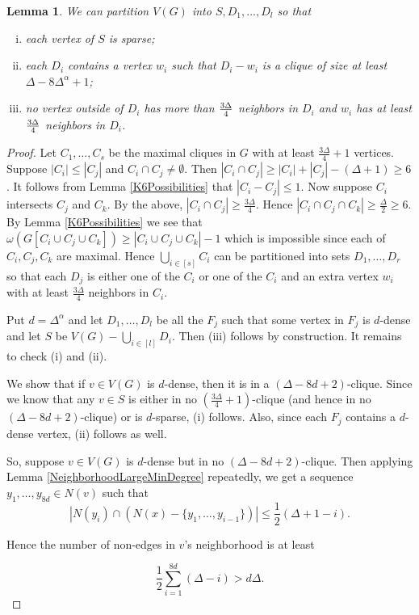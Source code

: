 \documentclass[12pt]{article}
\newtheorem{lemma}[theorem]{Lemma}
\theoremstyle{definition}
\begin{document}
\begin{lemma}\label{decomp}
We can partition $V(G)$ into $S, D_1, \ldots, D_l$ so that
\begin{enumerate}[(i)]
\item each vertex of $S$ is sparse;
\item each $D_i$ contains a vertex $w_i$ such that $D_i-w_i$ is a clique of size at least $\Delta-8\Delta^{\alpha}+1$;
\item no vertex outside of $D_i$ has more than ${3\Delta\over 4}$ neighbors in $D_i$ and $w_i$ has at least ${3\Delta\over 4}$ neighbors in $D_i$.
\end{enumerate}
\end{lemma}
\begin{proof}
Let $C_1, \ldots, C_s$ be the maximal cliques in $G$ with at least $\frac{3\Delta}{4} + 1$ vertices.  Suppose $|C_i| \leq |C_j|$ and $C_i \cap C_j \neq \emptyset$. 
Then $|C_i \cap C_j| \geq |C_i| + |C_j| - (\Delta + 1) \geq 6$.  It follows from Lemma
\ref{K6Possibilities} that $|C_i - C_j| \leq 1$.  Now suppose $C_i$ intersects $C_j$ and $C_k$.  By the above,
$|C_i \cap C_j| \geq \frac{3\Delta}{4}$.  Hence $|C_i \cap C_j \cap C_k| \geq \frac{\Delta}{2} \geq 6$.  By Lemma \ref{K6Possibilities} we see that $\omega(G[C_i \cup C_j \cup C_k]) \geq |C_i \cup C_j \cup C_k| - 1$ which is impossible since each of $C_i, C_j, C_k$ are maximal.  Hence $\bigcup_{i \in [s]} C_i$ can be
partitioned into sets $D_1, \ldots, D_r$ so that each $D_j$ is either one of the $C_i$ or one of the $C_i$ and an extra vertex $w_i$ with at least $\frac{3\Delta}{4}$ neighbors in $C_i$.

Put $d = \Delta^{\alpha}$ and let $D_1, \ldots, D_l$ be all the $F_j$ such that some vertex in $F_j$ is $d$-dense and let $S$ be $V(G) - \bigcup_{i \in [l]} D_i$.  Then (iii) follows by construction.  It remains to check (i) and (ii).

We show that if $v \in V(G)$ is $d$-dense, then it is in a $(\Delta - 8d + 2)$-clique. Since we know that any $v \in S$ is either in no $(\frac{3\Delta}{4} + 1)$-clique (and hence in no $(\Delta - 8d + 2)$-clique) or is $d$-sparse, (i) follows. Also, since each $F_j$ contains a $d$-dense vertex, (ii) follows as well.

So, suppose $v \in V(G)$ is $d$-dense but in no $(\Delta - 8d + 2)$-clique. Then applying Lemma \ref{NeighborhoodLargeMinDegree} repeatedly, we get a sequence $y_1, \ldots, y_{8d} \in N(v)$ such that 
\[|N(y_i) \cap (N(x) - \{y_1, \ldots, y_{i-1}\})| \leq \frac12 (\Delta + 1 - i).\]

Hence the number of non-edges in $v$'s neighborhood is at least 

\[\frac12\sum_{i=1}^{8d} (\Delta - i) > d\Delta.\]
\end{proof}
\end{document}
